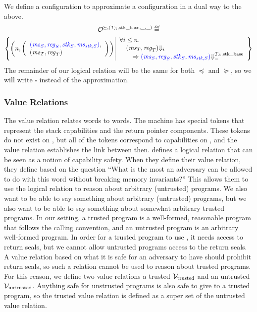 \begin{jversion}
We define a \trgcm{} configuration to approximate a \srccm{} configuration in a dual way to the above.
\begin{multline*}
  \lro[\succeq,(\ta,\stkb,\_,\_)] \defeq \\\left\{ \npair{\left(\array{l}\src{(\ms_S,\reg_S,\stk_S,\ms_{\stk,S})},\\(\ms_T,\reg_T)\endarray\right)} \middle|
    \begin{array}{l}
      \forall i \leq n \ldotp \\ 
      \quad (\ms_T ,\reg_T) \term[i] \\\qquad\Rightarrow \src{(\ms_S,\reg_S,\stk_S,\ms_{\stk,S})} \sterm{\ta,\stkb}
    \end{array}
\right\}
\end{multline*}
The remainder of our logical relation will be the same for both $\preceq$ and $\succeq$, so we will write $\square$ instead of the approximation.

\subsubsection{Value Relations}
The value relation relates \trgcm{} words to \srccm{} words.
The \srccm{} machine has special tokens that represent the stack capabilities and the return pointer components.
These tokens do not exist on \trgcm{}, but all of the tokens correspond to capabilities on \trgcm{}, and the value relation establishes the link between then.
\citet{skorstengaard_reasoning_2017} defines a logical relation that can be seen as a notion of capability safety.
When they define their value relation, they define based on the question ``What is the most an adversary can be allowed to do with this word without breaking memory invariants?''
This allows them to use the logical relation to reason about arbitrary (untrusted) programs.
We also want to be able to say something about arbitrary (untrusted) programs, but we also want to be able to say something about somewhat arbitrary trusted programs.
In our setting, a trusted program is a well-formed, reasonable program that follows the \stktokens{} calling convention, and an untrusted program is an arbitrary well-formed program.
In order for a trusted program to use \stktokens{}, it needs access to return seals, but we cannot allow untrusted programs access to the return seals.
A value relation based on what it is safe for an adversary to have should prohibit return seals, so such a relation cannot be used to reason about trusted programs.
For this reason, we define two value relations a trusted $\mathcal{V}_{\mathrm{trusted}}$ and an untrusted $\mathcal{V}_{\mathrm{untrusted}}$.
Anything safe for unstrusted programs is also safe to give to a trusted program, so the trusted value relation is defined as a super set of the untrusted value relation.


\end{jversion}
